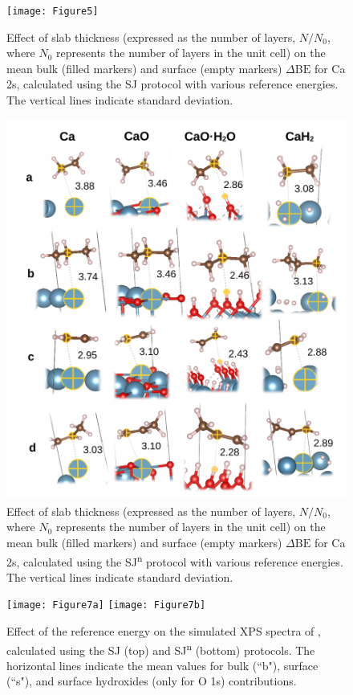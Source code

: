 \documentclass[journal=jpccck,manuscript=article]{achemso}
\def\dbe{\ensuremath{\Delta\text{BE}}}
\begin{document}
\begin{figure}[!h]
	\centering
	\texttt{[image: Figure5]}
	\caption{Effect of slab thickness (expressed as the number of layers, $N/N_0$, where $N_0$ represents the number of layers in the unit cell) on the mean bulk (filled markers) and surface (empty markers) \dbe{} for Ca 2s, calculated using the SJ protocol with various reference energies. The vertical lines indicate standard deviation.}
	\label{fig:slabsthicknessSJ}
\end{figure}

\begin{figure}[!h]
	\centering
	\includegraphics[width=.85\linewidth]{Figure6}
	\caption{Effect of slab thickness (expressed as the number of layers, $N/N_0$, where $N_0$ represents the number of layers in the unit cell) on the mean bulk (filled markers) and surface (empty markers) \dbe{} for Ca 2s, calculated using the SJ\textsuperscript{n} protocol with various reference energies. The vertical lines indicate standard deviation.}
	\label{fig:slabsthicknessSJn}
\end{figure}


\begin{figure}[!h]
	\centering
	\texttt{[image: Figure7a]}
	\texttt{[image: Figure7b]}
	\caption{Effect of the reference energy on the simulated XPS spectra of , calculated using the SJ (top) and SJ\textsuperscript{n} (bottom) protocols. The horizontal lines indicate the mean values for bulk (``b"), surface (``s"), and surface hydroxides (only for O 1s) contributions.}
	\label{fig:slabOH2}
\end{figure}
\end{document}
